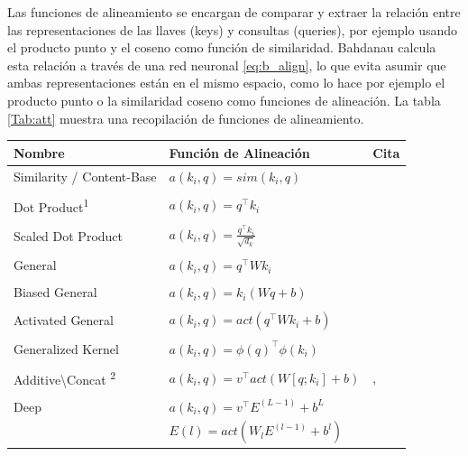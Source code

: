 Las funciones de alineamiento se encargan de comparar y extraer la relación entre las representaciones de las llaves (keys) y
consultas (queries), por ejemplo usando el producto punto y el coseno como función de similaridad.
Bahdanau calcula esta relación a través de una red neuronal \ref{eq:b_align}, lo que evita asumir
que ambas representaciones están en el mismo espacio, como lo hace por ejemplo el producto
punto o la similaridad coseno como funciones de alineación. La tabla \ref{Tab:att} muestra una
recopilación de funciones de alineamiento.


\begin{table}[ht!]
\begin{center}
\begin{tabular}{@{}lll@{}}
\toprule
\textbf{Nombre} & \textbf{Función de Alineación} & \textbf{Cita} \\
\midrule
Similarity / Content-Base & $a(k_i, q) = sim(k_i, q)$ & \citeauthor{DBLP:journals/corr/GravesWD14} \\ \\
Dot Product\textsuperscript{1} & $a(k_i, q) = q^\top k_i$ & \citeauthor{DBLP:journals/corr/LuongPM15} \\ \\
Scaled Dot Product & $a(k_i, q) = \frac{q^\top k_i}{\sqrt{d_k}}$ & \citeauthor{DBLP:journals/corr/VaswaniSPUJGKP17} \\ \\
General & $a(k_i, q) = q^\top W k_i$ & \citeauthor{DBLP:journals/corr/LuongPM15} \\ \\
Biased General & $a(k_i, q) = k_i (Wq + b )$ & \citeauthor{DBLP:journals/corr/SordoniBB16} \\ \\
Activated General & $a(k_i, q) = act(q^\top W k_i + b)$ & \citeauthor{DBLP:journals/corr/abs-1709-00893} \\ \\
Generalized Kernel & $a(k_i, q) = \phi(q)^\top \phi(k_i)$ & \citeauthor{DBLP:journals/corr/abs-2009-14794} \\ \\
Additive\textbackslash Concat \textsuperscript{2} & $a(k_i, q) = v^\top act(W[q;k_i]+ b)$ & \citeauthor{bahdanau2016neural}, \citeauthor{DBLP:journals/corr/LuongPM15} \\ \\
Deep & $a(k_i, q) = v^\top E^{(L-1)} + b^L$ & \citeauthor{Pavlopoulos} \\
    & $E(l) = act(W_l E^{(l-1)} + b^l)$ &  \\

\end{tabular}
\end{center}
\end{table}
